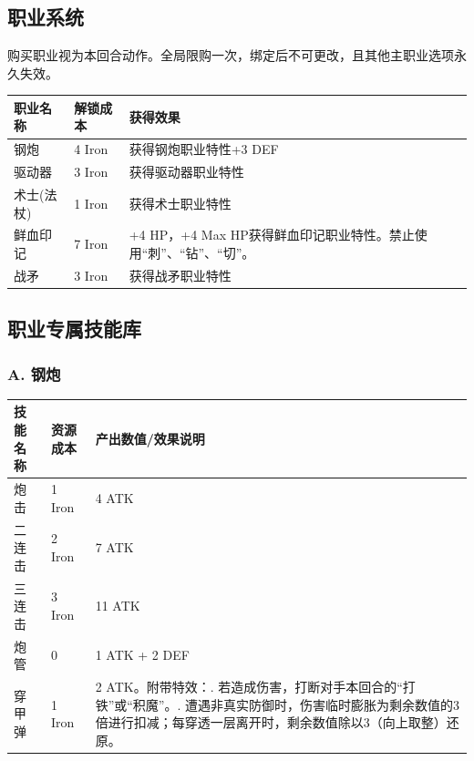 \documentclass[a4paper,10pt]{ctexart}
\begin{document}
\subsection{职业系统}
购买职业视为本回合动作。全局限购一次，绑定后不可更改，且其他主职业选项永久失效。

\begin{table}[h]
\centering
\begin{tabularx}{\textwidth}{llX}
\toprule
职业名称 & 解锁成本 & 获得效果 \\
\midrule
钢炮 & 4 Iron & 获得钢炮职业特性+3 DEF \\
驱动器 & 3 Iron & 获得驱动器职业特性 \\
术士(法杖) & 1 Iron & 获得术士职业特性 \\
鲜血印记 & 7 Iron & +4 HP，+4 Max HP获得鲜血印记职业特性。禁止使用“刺”、“钻”、“切”。 \\
战矛 & 3 Iron & 获得战矛职业特性 \\
\bottomrule
\end{tabularx}
\end{table}

\subsection{职业专属技能库}

\subsubsection*{A. 钢炮}
\begin{table}[h]
\centering
\begin{tabularx}{\textwidth}{llX}
\toprule
技能名称 & 资源成本 & 产出数值/效果说明 \\
\midrule
炮击 & 1 Iron & 4 ATK \\
二连击 & 2 Iron & 7 ATK \\
三连击 & 3 Iron & 11 ATK \\
炮管 & 0 & 1 ATK + 2 DEF \\
穿甲弹 & 1 Iron & 2 ATK。附带特效：\newline 1. 若造成伤害，打断对手本回合的“打铁”或“积魔”。\newline 2. 遭遇非真实防御时，伤害临时膨胀为剩余数值的3倍进行扣减；每穿透一层离开时，剩余数值除以3（向上取整）还原。 \\
\bottomrule
\end{tabularx}
\end{table}
\end{document}
